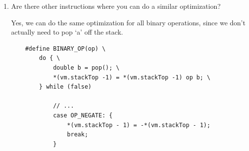 \documentclass{article}
\begin{document}
\begin{enumerate}
{        What are the costs and benefits of doing so?

        The first benefit is that our process only uses as much memory as it needs.
        At the OS level, dynamic allocation means that the process can grow/shrink.
        However, this will be much slower, as we are now at the mercy of the 
        memory allocator. Also, there is just a general overhead when a dynamic 
        array for the stack, since we need to track the capacity, and that introduces 
        an `if' statement, which can add up.
    }

    \item {
        Are there other instructions where you can do a similar optimization?

        Yes, we can do the same optimization for all binary operations, since we 
        don't actually need to pop `a' off the stack.

        \begin{verbatim}
    #define BINARY_OP(op) \
        do { \
            double b = pop(); \
            *(vm.stackTop -1) = *(vm.stackTop -1) op b; \
        } while (false)

            // ... 
            case OP_NEGATE: {
                *(vm.stackTop - 1) = -*(vm.stackTop - 1);
                break; 
            }
        \end{verbatim}
    }
\end{enumerate}
\end{document}
